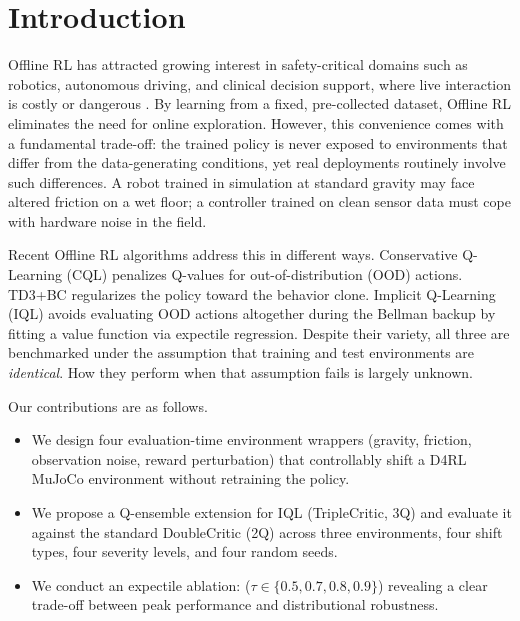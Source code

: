 \documentclass[conference]{IEEEtran}
\begin{document}
\section{Introduction}

Offline RL has attracted growing interest in safety-critical domains such as
robotics, autonomous driving, and clinical decision support, where live
interaction is costly or dangerous \cite{levine2020offline}. By learning from a
fixed, pre-collected dataset, Offline RL eliminates the need for online
exploration. However, this convenience comes with a fundamental trade-off: the
trained policy is never exposed to environments that differ from the
data-generating conditions, yet real deployments routinely involve such
differences. A robot trained in simulation at standard gravity may face altered
friction on a wet floor; a controller trained on clean sensor data must cope
with hardware noise in the field.

Recent Offline RL algorithms address this in different ways. Conservative
Q-Learning (CQL) \cite{kumar2020cql} penalizes Q-values for
out-of-distribution (OOD) actions. TD3+BC \cite{fujimoto2021td3bc} regularizes
the policy toward the behavior clone. Implicit Q-Learning (IQL)
\cite{kostrikov2022iql} avoids evaluating OOD actions altogether during the
Bellman backup by fitting a value function via expectile regression. Despite
their variety, all three are benchmarked under the assumption that training and
test environments are \emph{identical}. How they perform when that assumption
fails is largely unknown.

Our contributions are as follows.
\begin{itemize}
  \item We design four evaluation-time environment wrappers (gravity, friction,
        observation noise, reward perturbation) that controllably shift a
        D4RL MuJoCo environment without retraining the policy.
  \item We propose a Q-ensemble extension for IQL (TripleCritic, 3Q) and
        evaluate it against the standard DoubleCritic (2Q) across three
        environments, four shift types, four severity levels, and four random
        seeds.
  \item We conduct an expectile ablation:
        \newline ($\tau \in \{0.5, 0.7, 0.8, 0.9\}$)
        revealing a clear trade-off between peak performance and
        distributional robustness.
\end{itemize}
\end{document}
